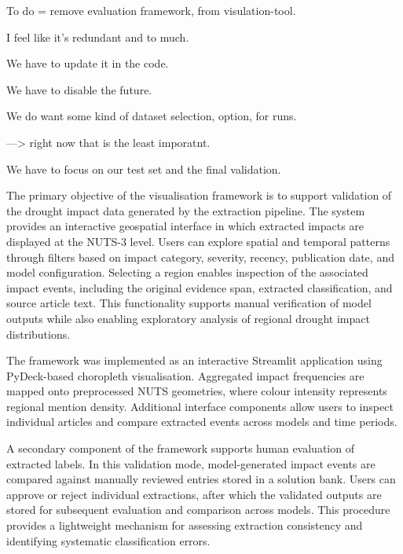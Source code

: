 To do = remove evaluation framework, from visulation-tool.

I feel like it's redundant and to much. 

We have to update it in the code.

We have to disable the future.

We do want some kind of dataset selection, option, for runs.

---> right now that is the least imporatnt. 

We have to focus on our test set and the final validation.




The primary objective of the visualisation framework is to support validation of the drought impact data generated by the extraction pipeline. The system provides an interactive geospatial interface in which extracted impacts are displayed at the NUTS-3 level. Users can explore spatial and temporal patterns through filters based on impact category, severity, recency, publication date, and model configuration. Selecting a region enables inspection of the associated impact events, including the original evidence span, extracted classification, and source article text. This functionality supports manual verification of model outputs while also enabling exploratory analysis of regional drought impact distributions.

The framework was implemented as an interactive Streamlit application using PyDeck-based choropleth visualisation. Aggregated impact frequencies are mapped onto preprocessed NUTS geometries, where colour intensity represents regional mention density. Additional interface components allow users to inspect individual articles and compare extracted events across models and time periods.

A secondary component of the framework supports human evaluation of extracted labels. In this validation mode, model-generated impact events are compared against manually reviewed entries stored in a solution bank. Users can approve or reject individual extractions, after which the validated outputs are stored for subsequent evaluation and comparison across models. This procedure provides a lightweight mechanism for assessing extraction consistency and identifying systematic classification errors.











